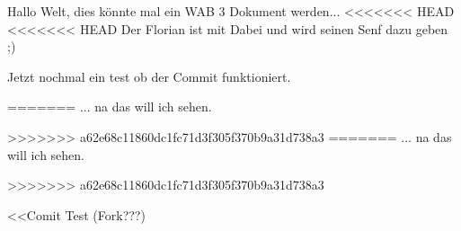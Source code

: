 \documentclass[a4paper,12pt]{scrreprt}
\begin{document}
Hallo Welt, dies könnte mal ein WAB 3 Dokument werden...
<<<<<<< HEAD
<<<<<<< HEAD
Der Florian ist mit Dabei und wird seinen Senf dazu geben ;)

Jetzt nochmal ein test ob der Commit funktioniert.

=======
... na das will ich sehen.

>>>>>>> a62e68c11860dc1fc71d3f305f370b9a31d738a3
=======
... na das will ich sehen.

>>>>>>> a62e68c11860dc1fc71d3f305f370b9a31d738a3

<<Comit Test (Fork???)
\end{document}
